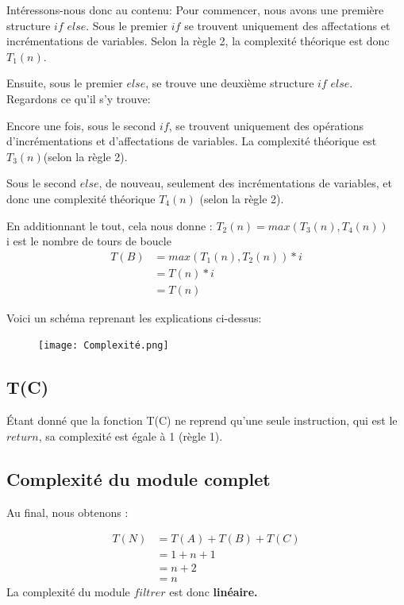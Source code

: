 \documentclass[a4paper, 11pt, oneside]{article}
\begin{document}
Intéressons-nous donc au contenu: 
Pour commencer, nous avons une première structure $if$ $else$. Sous le premier $if$ se trouvent uniquement des affectations et incrémentations de variables. Selon la règle 2, la complexité théorique est donc $T_1(n)$. 


Ensuite, sous le premier $else$, se trouve une deuxième structure $if$ $else$. Regardons ce qu'il s'y trouve:

Encore une fois, sous le second $if$, se trouvent uniquement des opérations d'incrémentations et d'affectations de variables. La complexité théorique est $T_3(n)$(selon la règle 2). 

Sous le second $else$, de nouveau, seulement des incrémentations de variables, et donc une complexité théorique $T_4(n)$ (selon la règle 2). 


En additionnant le tout, cela nous donne : 
$T_2(n) =  max(T_3(n), T_4(n))$
\\i est le nombre de tours de boucle
\begin{align}
  T(B) &= max(T_1(n), T_2(n)) * i\nonumber \\
       &= T(n) * i  \nonumber \\
       &=T(n) \nonumber
\end{align}

Voici un schéma reprenant les explications ci-dessus:
\\
\begin{figure}
\centering \texttt{[image: Complexité.png]}
\end{figure}

\subsection{T(C)}

Étant donné que la fonction T(C) ne reprend qu'une seule instruction, qui est le $return$, sa complexité est égale à 1 (règle 1).

\subsection{Complexité du module complet}

Au final, nous obtenons :

\begin{align}
  T(N) &= T(A) + T(B) + T(C) \nonumber \\
       &= 1 + n + 1 \nonumber \\
       &= n + 2 \nonumber \\
       &= n
\end{align}
La complexité du module $filtrer$ est donc \bf linéaire.
\end{document}
